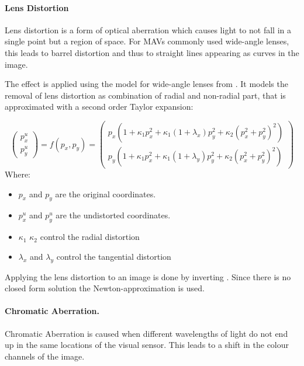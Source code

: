 \paragraph{Lens Distortion}

Lens distortion is a form of optical aberration which causes light to not fall in a single point but a region of space. For \acp{MAV} commonly used wide-angle lenses, this leads to barrel distortion and thus to straight lines appearing as curves in the image.

The effect is applied using the model for wide-angle lenses from \cite{Vass}. It models the removal of lens distortion as combination of radial and non-radial part, that is approximated with a second order Taylor expansion:

\begin{equation}
\begin{pmatrix}
p_x^u \\
p_y^u  
\end{pmatrix}=
f(p_x,p_y) =
\begin{pmatrix}
p_x (1 + \kappa_1 p_x^2 + \kappa_1 (1 + \lambda_x) p_y^2 + \kappa_2(p_x^2 + p_y^2)^2) \\
p_y (1 + \kappa_1 p_x^2 + \kappa_1 (1 + \lambda_y) p_y^2 + \kappa_2(p_x^2 + p_y^2)^2)
\end{pmatrix} 
\label{eq:distortion}
\end{equation}
Where:
\begin{itemize}
	\item $p_x$ and $p_y$ are the original coordinates.
	\item $p_x^u$ and $p_y^u$ are the undistorted coordinates.
	\item $\kappa_1$ $\kappa_2$ control the radial distortion 
	\item $\lambda_x$ and $\lambda_y$ control the tangential distortion
\end{itemize}

Applying the lens distortion to an image is done by inverting . Since there is no closed form solution the Newton-approximation is used.


\paragraph{Chromatic Aberration.}

Chromatic Aberration is caused when different wavelengths of light do not end up in the same locations of the visual sensor. This leads to a shift in the colour channels of the image.

